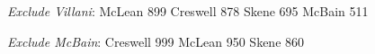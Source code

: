 \begin{resultsiii}



\emph{Exclude Villani}: McLean 899 Creswell 878 Skene 695 McBain 511


\emph{Exclude McBain}: Creswell 999 McLean 950 Skene 860



\end{resultsiii}
